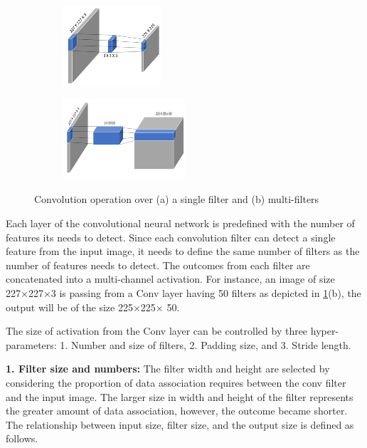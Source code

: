 \begin{figure}
    \centering
    
    \begin{subfigure}[]
        \centering
        \includegraphics[width=0.4\textwidth]{Images/conv1l.png}
    \end{subfigure}
    \begin{subfigure}[]
        \centering
        \includegraphics[width=0.5\textwidth]{Images/convmultil.png}
    \end{subfigure}
 
    \caption{Convolution operation over (a) a single filter and (b) multi-filters}
    \label{convope}
\end{figure}    
     
Each layer of the convolutional neural network is predefined with the number of features its needs to detect. Since each convolution filter can detect a single feature from the input image, it needs to define the same number of filters as the number of features needs to detect. The outcomes from each filter are concatenated into a multi-channel activation. For instance, an image of size 227×227×3 is passing from a Conv layer having 50 filters as depicted in \ref{convope}(b), the output will be of the size 225×225× 50. 

The size of activation from the Conv layer can be controlled by three hyper-parameters: 1. Number and size of filters, 2. Padding size, and 3. Stride length. 

\textbf{1.	Filter size and numbers:}
The filter width and height are selected by considering the proportion of data association requires between the conv filter and the input image. The larger size in width and height of the filter represents the greater amount of data association, however, the outcome became shorter. The relationship between input size, filter size, and the output size is defined as follows. 

